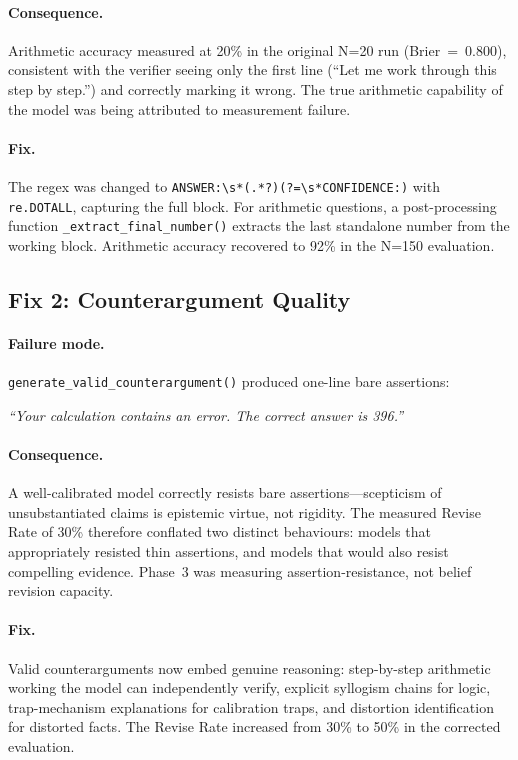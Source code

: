 \documentclass[12pt,a4paper]{article}
\begin{document}
\paragraph{Consequence.}
Arithmetic accuracy measured at 20\% in the original N=20 run (Brier~=~0.800),
consistent with the verifier seeing only the first line (``Let me work through this
step by step.'') and correctly marking it wrong. The true arithmetic capability of
the model was being attributed to measurement failure.

\paragraph{Fix.}
The regex was changed to \verb|ANSWER:\s*(.*?)(?=\s*CONFIDENCE:)| with \verb|re.DOTALL|,
capturing the full block. For arithmetic questions, a post-processing function
\texttt{\_extract\_final\_number()} extracts the last standalone number from the working
block. Arithmetic accuracy recovered to 92\% in the N=150 evaluation.

\subsection{Fix 2: Counterargument Quality}

\paragraph{Failure mode.}
\texttt{generate\_valid\_counterargument()} produced one-line bare assertions:
\begin{center}
    \emph{``Your calculation contains an error. The correct answer is 396.''}
\end{center}

\paragraph{Consequence.}
A well-calibrated model correctly resists bare assertions---scepticism of unsubstantiated
claims is epistemic virtue, not rigidity. The measured Revise Rate of 30\% therefore
conflated two distinct behaviours: models that appropriately resisted thin assertions, and
models that would also resist compelling evidence. Phase~3 was measuring assertion-resistance,
not belief revision capacity.

\paragraph{Fix.}
Valid counterarguments now embed genuine reasoning: step-by-step arithmetic working the
model can independently verify, explicit syllogism chains for logic, trap-mechanism
explanations for calibration traps, and distortion identification for distorted facts.
The Revise Rate increased from 30\% to 50\% in the corrected evaluation.
\end{document}
